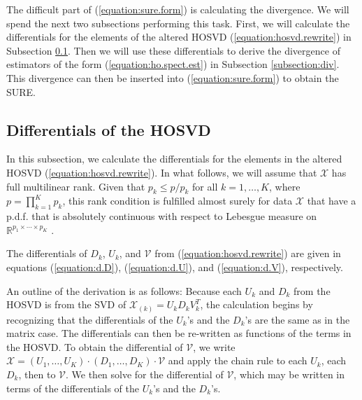 The difficult part of (\ref{equation:sure.form}) is calculating the divergence. We will spend the next two subsections performing this task. First, we will calculate the differentials for the elements of the altered HOSVD (\ref{equation:hosvd.rewrite}) in Subsection \ref{subsection:diff}. Then we will use these differentials to derive the divergence of estimators of the form (\ref{equation:ho.spect.est}) in Subsection \ref{subsection:div}. This divergence can then be inserted into (\ref{equation:sure.form}) to obtain the SURE.





\subsection{Differentials of the HOSVD}
\label{subsection:diff}
In this subsection, we calculate the differentials for the elements in the altered HOSVD (\ref{equation:hosvd.rewrite}). In what follows, we will assume that $\mathcal{X}$ has full multilinear rank. Given that $p_k \leq p/p_k$ for all $k = 1,\ldots,K$, where $p = \prod_{k=1}^Kp_k$, this rank condition is fulfilled almost surely for data $\mathcal{X}$ that have a p.d.f. that is absolutely continuous with respect to Lebesgue measure on $\mathbb{R}^{p_1\times\cdots\times p_K}$ \cite[Proposition 7.2]{de2008tensor}.

\begin{theorem}
\label{theorem:diff}
The differentials of $D_k$, $U_k$, and $\mathcal{V}$ from (\ref{equation:hosvd.rewrite}) are given in equations (\ref{equation:d.D}), (\ref{equation:d.U}), and (\ref{equation:d.V}), respectively.
\end{theorem}


An outline of the derivation is as follows: Because each $U_k$ and $D_k$ from the HOSVD is from the SVD of $\mathcal{X}_{(k)} = U_kD_kV_k^T$, the calculation begins by recognizing that the differentials of the $U_k$'s and the $D_k$'s are the same as in the matrix case. The differentials can then be re-written as functions of the terms in the HOSVD. To obtain the differential of $\mathcal{V}$, we write $\mathcal{X} = (U_1,\ldots,U_K)\cdot(D_1,\ldots,D_K)\cdot\mathcal{V}$ and apply the chain rule to each $U_k$, each $D_k$, then to $\mathcal{V}$. We then solve for the differential of $\mathcal{V}$, which may be written in terms of the differentials of the $U_k$'s and the $D_k$'s.

